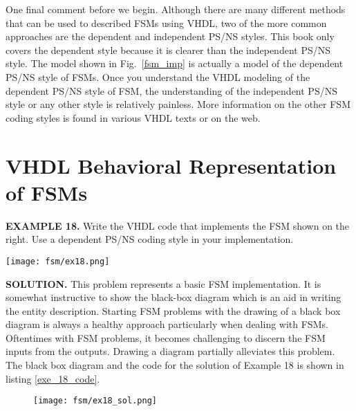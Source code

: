 One final comment before we begin. Although there are many different methods that can be used to described FSMs using VHDL, two of the more common approaches are the dependent and independent PS/NS styles. This book only covers the dependent style because it is clearer than the independent PS/NS style. The model shown in Fig.~\ref{fsm_imp} is actually a model of the dependent PS/NS style of FSMs. Once you understand the VHDL modeling of the dependent PS/NS style of FSM, the understanding of the independent PS/NS style or any other style is relatively painless. More information on the other FSM coding styles is found in various VHDL texts or on the web.

\section{VHDL Behavioral Representation of FSMs}

\begin{leftbar}
\begin{minipage}[t]{0.5\textwidth}
\vspace{10pt}
\noindent
\textbf{EXAMPLE 18.}
Write the VHDL code that implements the FSM shown on the right. Use a dependent PS/NS coding style in your implementation.
\end{minipage}
\begin{minipage}[t]{0.47\textwidth}
\vspace{0pt}\raggedright
    \centering
	\texttt{[image: fsm/ex18.png]}
\end{minipage}
\end{leftbar}
\noindent
\textbf{SOLUTION.} This problem represents a basic FSM implementation. It is somewhat instructive to show the black-box diagram which is an aid in writing the entity description. Starting FSM problems with the drawing of a black box diagram is always a healthy approach particularly when dealing with FSMs. Oftentimes with FSM problems, it becomes challenging to discern the FSM inputs from the outputs. Drawing a diagram partially alleviates this problem. The black box diagram and the code for the solution of Example 18 is shown in listing \ref{exe_18_code}.

\begin{figure}[!h]
    \centering
	\texttt{[image: fsm/ex18\_sol.png]}
\end{figure}

